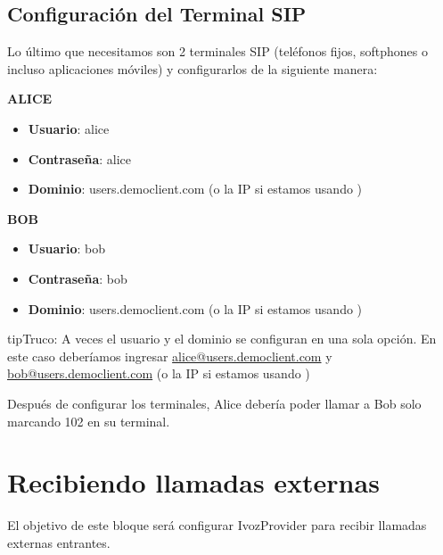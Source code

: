 \documentclass[letterpaper,10pt,spanish]{sphinxmanual}
\begin{document}
\section{Configuración del Terminal SIP}
\label{getting_started/internal_calls/configure_sipuacs:sip-terminal-configuration}\label{getting_started/internal_calls/configure_sipuacs::doc}
Lo último que necesitamos son 2 terminales SIP (teléfonos fijos, softphones o incluso aplicaciones móviles) y configurarlos de la siguiente manera:

\textbf{ALICE}
\begin{itemize}
\item {} 
\textbf{Usuario}: alice

\item {} 
\textbf{Contraseña}: alice

\item {} 
\textbf{Dominio}: users.democlient.com (o la IP si estamos usando {\hyperref[getting_started/internal_calls/brand_portal:dnshack]{}})

\end{itemize}

\textbf{BOB}
\begin{itemize}
\item {} 
\textbf{Usuario}: bob

\item {} 
\textbf{Contraseña}: bob

\item {} 
\textbf{Dominio}: users.democlient.com (o la IP si estamos usando {\hyperref[getting_started/internal_calls/brand_portal:dnshack]{}})

\end{itemize}

\begin{notice}{tip}{Truco:}
A veces el usuario y el dominio se configuran en una sola opción. En este caso deberíamos ingresar \href{mailto:alice@users.democlient.com}{alice@users.democlient.com} y \href{mailto:bob@users.democlient.com}{bob@users.democlient.com} (o la IP si estamos usando {\hyperref[getting_started/internal_calls/brand_portal:dnshack]{}})
\end{notice}

Después de configurar los terminales, Alice debería poder llamar a Bob solo marcando 102 en su terminal.


\chapter{Recibiendo llamadas externas}
\label{getting_started/external_incoming_calls/index::doc}\label{getting_started/external_incoming_calls/index:receiving-external-calls}
El objetivo de este bloque será configurar IvozProvider para recibir llamadas externas entrantes.
\end{document}
